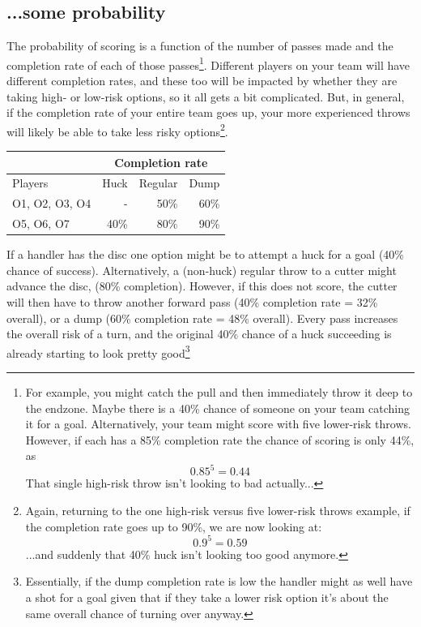 \documentclass{tufte-handout}
\begin{document}
\subsection{...some probability}
\label{sec:probability}
The probability 
of scoring  
is a function of 
the number of passes made 
and the completion rate of 
each of those passes\footnote{
For example, 
you might catch the pull 
and then immediately 
throw it deep 
to the endzone.
Maybe there is a 
40\% chance 
of someone on your team 
catching it for a goal. 
Alternatively, 
your team might 
score with five 
lower-risk throws. 
However, if each has 
a 85\% completion rate
the chance of scoring is only 44\%, 
as 
\begin{equation} 0.85^5 = 0.44 \end{equation}
That single high-risk 
throw isn't looking to bad actually...}. 
Different players 
on your team 
will have 
different completion rates, 
and these too 
will be impacted by 
whether they are 
taking high- or low-risk 
options, 
so it all gets a bit complicated.
But, 
in general, 
if the completion rate 
of your entire team goes up, 
your more experienced throws 
will likely be able to take 
less risky options\footnote{
Again, returning to the one high-risk  
versus five lower-risk throws example, 
if the completion rate goes up 
to 90\%, we are now looking at: 
\begin{equation} 0.9^5 = 0.59 \end{equation}
...and suddenly that 40\% huck 
isn't looking too good anymore.
}.  


\begin{margintable}
\caption{Completion rates 1}
\begin{tabular}{|l|r r r|}
\hline
 & \multicolumn{3}{|c|}{Completion rate} \\
 \hline
Players & Huck & Regular & Dump \\
O1, O2, O3, O4 & - & 50\% & 60\% \\
O5, O6, O7 & 40\% & 80\% & 90\%\\
\hline
\end{tabular}
\end{margintable}

If a handler has the disc 
one option 
might be 
to attempt 
a huck  for a goal 
(40\% chance of 
success).  
Alternatively, a 
(non-huck) 
regular throw 
to a cutter 
might advance the disc, 
(80\% completion). 
However, if this
does not score, 
the cutter 
will then have to 
throw another forward pass 
(40\% completion rate = 32\% overall),
or a dump (60\% completion rate = 48\% overall). 
Every pass increases 
the overall risk of a turn, 
and the original 
40\% chance
of a huck succeeding 
is already starting to look pretty good\footnote{
Essentially, if the 
dump completion 
rate is low the handler 
might as well 
have a shot for 
a goal 
given that if they take 
a lower risk option 
it's about the same overall chance 
of turning over anyway.} 
\end{document}
